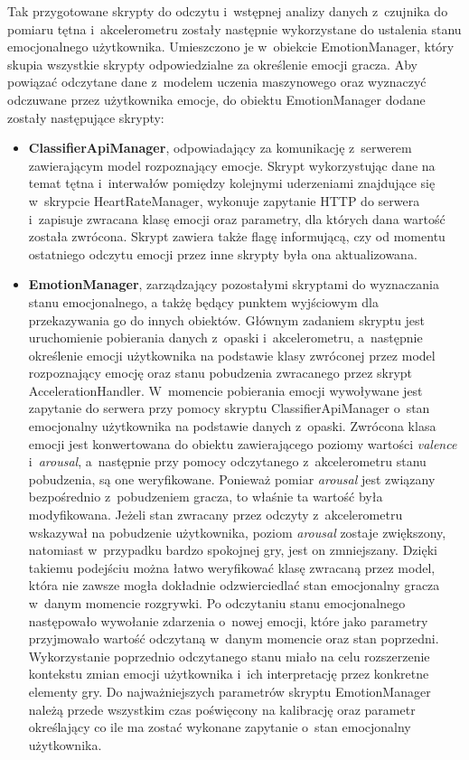 Tak przygotowane skrypty do odczytu i~wstępnej analizy danych z~czujnika do pomiaru tętna i~akcelerometru zostały następnie wykorzystane do ustalenia stanu emocjonalnego użytkownika. Umieszczono je w~obiekcie EmotionManager, który skupia wszystkie skrypty odpowiedzialne za określenie emocji gracza. Aby powiązać odczytane dane z~modelem uczenia maszynowego oraz wyznaczyć odczuwane przez użytkownika emocje, do obiektu EmotionManager dodane zostały następujące skrypty:
\begin{itemize}
	\item \textbf{ClassifierApiManager}, odpowiadający za komunikację z~serwerem zawierającym model rozpoznający emocje. Skrypt wykorzystując dane na temat tętna i~interwałów pomiędzy kolejnymi uderzeniami znajdujące się w~skrypcie HeartRateManager, wykonuje zapytanie HTTP do serwera i~zapisuje zwracana klasę emocji oraz parametry, dla których dana wartość została zwrócona. Skrypt zawiera także flagę informującą, czy od momentu ostatniego odczytu emocji przez inne skrypty była ona aktualizowana.
	\item \textbf{EmotionManager}, zarządzający pozostałymi skryptami do wyznaczania stanu emocjonalnego, a takżę będący punktem wyjściowym dla przekazywania go do innych obiektów. Głównym zadaniem skryptu jest uruchomienie pobierania danych z~opaski i~akcelerometru, a~następnie określenie emocji użytkownika na podstawie klasy zwróconej przez model rozpoznający emocję oraz stanu pobudzenia zwracanego przez skrypt AccelerationHandler. W~momencie pobierania emocji wywoływane jest zapytanie do serwera przy pomocy skryptu ClassifierApiManager o~stan emocjonalny użytkownika na podstawie danych z~opaski. Zwrócona klasa emocji jest konwertowana do obiektu zawierającego poziomy wartości \textit{valence} i~\textit{arousal}, a~następnie przy pomocy odczytanego z~akcelerometru stanu pobudzenia, są one weryfikowane. Ponieważ pomiar \textit{arousal} jest związany bezpośrednio z~pobudzeniem gracza, to właśnie ta wartość była modyfikowana. Jeżeli stan zwracany przez odczyty z~akcelerometru wskazywał na pobudzenie użytkownika, poziom \textit{arousal} zostaje zwiększony, natomiast w~przypadku bardzo spokojnej gry, jest on zmniejszany. Dzięki takiemu podejściu można łatwo weryfikować klasę zwracaną przez model, która nie zawsze mogła dokładnie odzwierciedlać stan emocjonalny gracza w~danym momencie rozgrywki. Po odczytaniu stanu emocjonalnego następowało wywołanie zdarzenia o~nowej emocji, które jako parametry przyjmowało wartość odczytaną w~danym momencie oraz stan poprzedni. Wykorzystanie poprzednio odczytanego stanu miało na celu rozszerzenie kontekstu zmian emocji użytkownika i~ich interpretację przez konkretne elementy gry. Do najważniejszych parametrów skryptu EmotionManager należą przede wszystkim czas poświęcony na kalibrację oraz parametr określający co ile ma zostać wykonane zapytanie o~stan emocjonalny użytkownika. 
\end{itemize}


